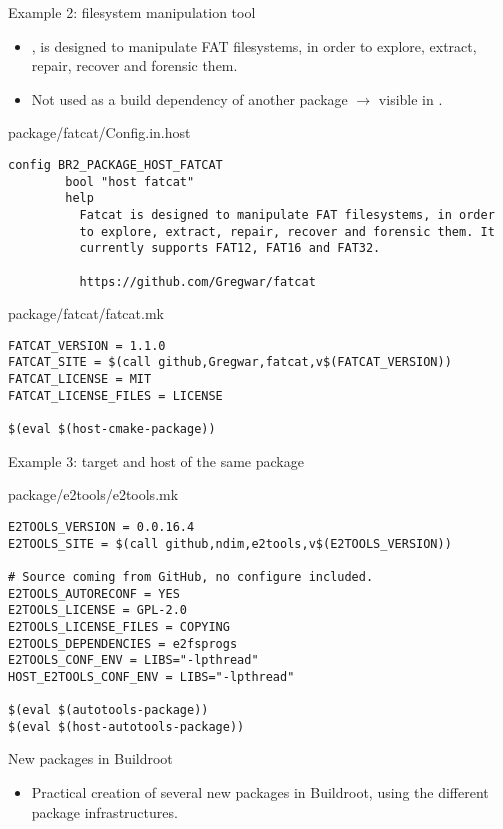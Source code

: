 \begin{frame}[fragile]{Example 2: filesystem manipulation tool}

  \begin{itemize}
  \item {}, is designed to manipulate FAT filesystems, in
    order to explore, extract, repair, recover and forensic them.
  \item Not used as a build dependency of another package
    $\rightarrow$ visible in .
  \end{itemize}
  \begin{block}{package/fatcat/Config.in.host}
    \tiny
\begin{verbatim}
config BR2_PACKAGE_HOST_FATCAT
        bool "host fatcat"
        help
          Fatcat is designed to manipulate FAT filesystems, in order
          to explore, extract, repair, recover and forensic them. It
          currently supports FAT12, FAT16 and FAT32.

          https://github.com/Gregwar/fatcat
\end{verbatim}
  \end{block}

  \begin{block}{package/fatcat/fatcat.mk}
    \begin{verbatim}
FATCAT_VERSION = 1.1.0
FATCAT_SITE = $(call github,Gregwar,fatcat,v$(FATCAT_VERSION))
FATCAT_LICENSE = MIT
FATCAT_LICENSE_FILES = LICENSE

$(eval $(host-cmake-package))
    \end{verbatim}
  \end{block}
\end{frame}

\begin{frame}[fragile]{Example 3: target and host of the same package}
  \begin{block}{package/e2tools/e2tools.mk}
    \begin{verbatim}
E2TOOLS_VERSION = 0.0.16.4
E2TOOLS_SITE = $(call github,ndim,e2tools,v$(E2TOOLS_VERSION))

# Source coming from GitHub, no configure included.
E2TOOLS_AUTORECONF = YES
E2TOOLS_LICENSE = GPL-2.0
E2TOOLS_LICENSE_FILES = COPYING
E2TOOLS_DEPENDENCIES = e2fsprogs
E2TOOLS_CONF_ENV = LIBS="-lpthread"
HOST_E2TOOLS_CONF_ENV = LIBS="-lpthread"

$(eval $(autotools-package))
$(eval $(host-autotools-package))
    \end{verbatim}
  \end{block}
\end{frame}

\setuplabframe
{New packages in Buildroot}
{
  \begin{itemize}
  \item Practical creation of several new packages in Buildroot, using
    the different package infrastructures.
  \end{itemize}
}
